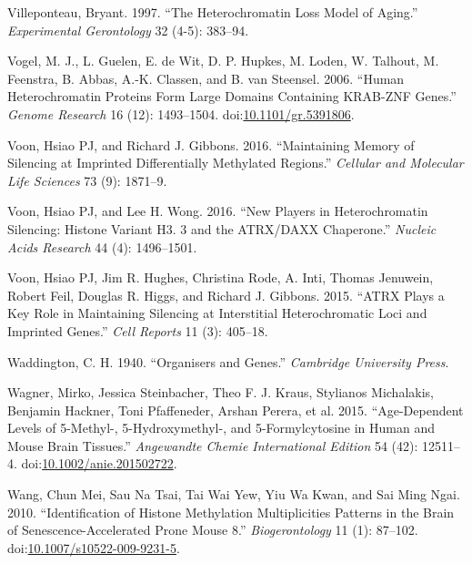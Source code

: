 \documentclass[onehalf,12pt]{beavtex}
\begin{document}
  \hypertarget{ref-Villeponteauheterochromatinlossmodel1997}{}
  Villeponteau, Bryant. 1997. ``The Heterochromatin Loss Model of Aging.''
  \emph{Experimental Gerontology} 32 (4-5): 383--94.
  
  \hypertarget{ref-VogelHumanheterochromatinproteins2006}{}
  Vogel, M. J., L. Guelen, E. de Wit, D. P. Hupkes, M. Loden, W. Talhout,
  M. Feenstra, B. Abbas, A.-K. Classen, and B. van Steensel. 2006. ``Human
  Heterochromatin Proteins Form Large Domains Containing KRAB-ZNF Genes.''
  \emph{Genome Research} 16 (12): 1493--1504.
  doi:\href{https://doi.org/10.1101/gr.5391806}{10.1101/gr.5391806}.
  
  \hypertarget{ref-VoonMaintainingmemorysilencing2016}{}
  Voon, Hsiao PJ, and Richard J. Gibbons. 2016. ``Maintaining Memory of
  Silencing at Imprinted Differentially Methylated Regions.''
  \emph{Cellular and Molecular Life Sciences} 73 (9): 1871--9.
  
  \hypertarget{ref-VoonNewplayersheterochromatin2016}{}
  Voon, Hsiao PJ, and Lee H. Wong. 2016. ``New Players in Heterochromatin
  Silencing: Histone Variant H3. 3 and the ATRX/DAXX Chaperone.''
  \emph{Nucleic Acids Research} 44 (4): 1496--1501.
  
  \hypertarget{ref-VoonATRXplayskey2015}{}
  Voon, Hsiao PJ, Jim R. Hughes, Christina Rode, A. Inti, Thomas Jenuwein,
  Robert Feil, Douglas R. Higgs, and Richard J. Gibbons. 2015. ``ATRX
  Plays a Key Role in Maintaining Silencing at Interstitial
  Heterochromatic Loci and Imprinted Genes.'' \emph{Cell Reports} 11 (3):
  405--18.
  
  \hypertarget{ref-WaddingtonOrganisersGenes1940}{}
  Waddington, C. H. 1940. ``Organisers and Genes.'' \emph{Cambridge
  University Press}.
  
  \hypertarget{ref-WagnerAgeDependentLevels5Methyl2015}{}
  Wagner, Mirko, Jessica Steinbacher, Theo F. J. Kraus, Stylianos
  Michalakis, Benjamin Hackner, Toni Pfaffeneder, Arshan Perera, et al.
  2015. ``Age-Dependent Levels of 5-Methyl-, 5-Hydroxymethyl-, and
  5-Formylcytosine in Human and Mouse Brain Tissues.'' \emph{Angewandte
  Chemie International Edition} 54 (42): 12511--4.
  doi:\href{https://doi.org/10.1002/anie.201502722}{10.1002/anie.201502722}.
  
  \hypertarget{ref-WangIdentificationhistonemethylation2010}{}
  Wang, Chun Mei, Sau Na Tsai, Tai Wai Yew, Yiu Wa Kwan, and Sai Ming
  Ngai. 2010. ``Identification of Histone Methylation Multiplicities
  Patterns in the Brain of Senescence-Accelerated Prone Mouse 8.''
  \emph{Biogerontology} 11 (1): 87--102.
  doi:\href{https://doi.org/10.1007/s10522-009-9231-5}{10.1007/s10522-009-9231-5}.
  
\end{document}
